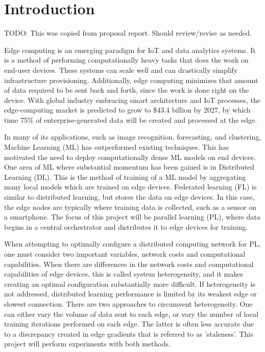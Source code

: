 \documentclass[../mthe-493-final-project.tex]{subfiles}
\begin{document}
    \chapter{Introduction}
    \label{ch:introduction}

    TODO: This was copied from proposal report. Should review/revise as needed.

    Edge computing is an emerging paradigm for IoT and data analytics systems. It is a method of performing computationally heavy tasks that does the work on end-user devices. These systems can scale well and can drastically simplify infrastructure provisioning. Additionally, edge computing minimizes that amount of data required to be sent back and forth, since the work is done right on the device. With global industry embracing smart architecture and IoT processes, the edge-computing market is predicted to grow to \$43.4 billion by 2027, by which time 75\% of enterprise-generated data will be created and processed at the edge.~\cite{noauthor_edge_2020}

    In many of its applications, such as image recognition, forecasting, and clustering, Machine Learning (ML) has outperformed existing techniques. This has motivated the need to deploy computationally dense ML models on end devices. One area of ML where substantial momentum has been gained is in Distributed Learning (DL). This is the method of training of a ML model by aggregating many local models which are trained on edge devices. Federated learning (FL) is similar to distributed learning, but stores the data on edge devices. In this case, the edge nodes are typically where training data is collected, such as a sensor on a smartphone. The focus of this project will be parallel learning (PL), where data begins in a central orchestrator and distributes it to edge devices for training.

    When attempting to optimally configure a distributed computing network for PL, one must consider two important variables, network costs and computational capabilities. When there are differences in the network costs and computational capabilities of edge devices, this is called system heterogeneity, and it makes creating an optimal configuration substantially more difficult. If heterogeneity is not addressed, distributed learning performance is limited by its weakest edge or slowest connection. There are two approaches to circumvent heterogeneity. One can either vary the volume of data sent to each edge, or vary the number of local training iterations performed on each edge. The latter is often less accurate due to a discrepancy created in edge gradients that is referred to as 'staleness'. This project will perform experiments with both methods.
\end{document}
